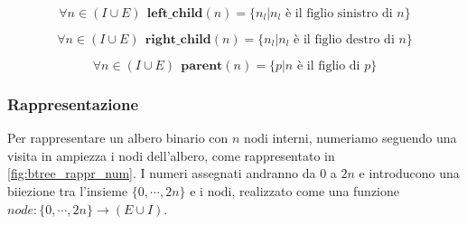 $$
	\forall n \in (I \cup E) ~~ \mathbf{left\_child}(n) = \{n_l | n_l \text{ è il figlio sinistro di } n\}
$$

$$
	\forall n \in (I \cup E) ~~ \mathbf{right\_child}(n) = \{n_l | n_l \text{ è il figlio destro di } n\}
$$

$$
	\forall n \in (I \cup E) ~~ \mathbf{parent}(n) = \{p | n \text{ è il figlio di } p\}
$$


\subsubsection{Rappresentazione}
Per rappresentare un albero binario con $n$ nodi interni, numeriamo seguendo una visita in
ampiezza i nodi dell'albero, come rappresentato in \cref{fig:btree_rappr_num}. I numeri assegnati
andranno da $0$ a $2n$ e introducono una biiezione tra l'insieme $\{0, \cdots, 2n\}$ e i nodi,
realizzato come una funzione $node: \{0, \cdots, 2n\} \rightarrow (E \cup I)$.

